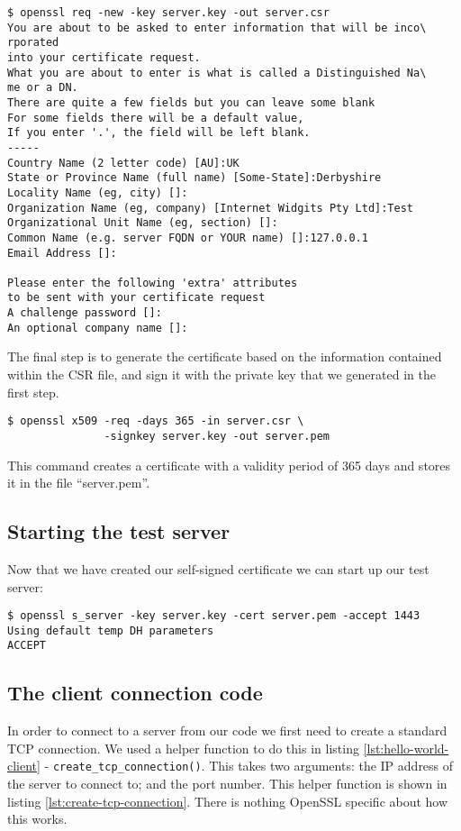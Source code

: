 \begin{verbatim}
$ openssl req -new -key server.key -out server.csr
You are about to be asked to enter information that will be inco\
rporated
into your certificate request.
What you are about to enter is what is called a Distinguished Na\
me or a DN.
There are quite a few fields but you can leave some blank
For some fields there will be a default value,
If you enter '.', the field will be left blank.
-----
Country Name (2 letter code) [AU]:UK
State or Province Name (full name) [Some-State]:Derbyshire
Locality Name (eg, city) []:
Organization Name (eg, company) [Internet Widgits Pty Ltd]:Test
Organizational Unit Name (eg, section) []:
Common Name (e.g. server FQDN or YOUR name) []:127.0.0.1
Email Address []:

Please enter the following 'extra' attributes
to be sent with your certificate request
A challenge password []:
An optional company name []:
\end{verbatim}

The final step is to generate the certificate based on the information 
contained within the CSR file, and sign it with the private key that we generated
in the first step.

\begin{verbatim}
$ openssl x509 -req -days 365 -in server.csr \
               -signkey server.key -out server.pem
\end{verbatim}

This command creates a certificate with a validity period of 365 days and 
stores it in the file ``server.pem''.

\subsection{Starting the test server}
\label{sec:start-test-server}

Now that we have created our self-signed certificate we can start up our test 
server:

\begin{verbatim}
$ openssl s_server -key server.key -cert server.pem -accept 1443
Using default temp DH parameters
ACCEPT
\end{verbatim}

\subsection{The client connection code}

In order to connect to a server from our code we first need to create a standard
TCP connection. We used a helper function to do this in listing
\ref{lst:hello-world-client} - \verb!create_tcp_connection()!. This takes two
arguments: the IP address of the server to connect to; and the port number. This
helper function is shown in listing \ref{lst:create-tcp-connection}. There is 
nothing OpenSSL specific about how this works.

